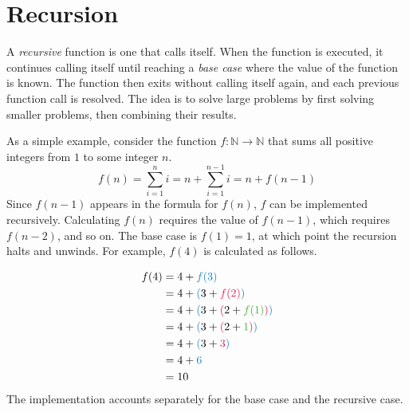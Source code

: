 \section*{Recursion} %

A \emph{recursive} function is one that calls itself. 
When the function is executed, it continues calling itself until reaching a \emph{base case} where the value of the function is known. 
The function then exits without calling itself again, and each previous function call is resolved. 
The idea is to solve large problems by first solving smaller problems, then combining their results.

As a simple example, consider the function $f:\mathbb{N}\rightarrow\mathbb{N}$ that sums all positive integers from $1$ to some integer $n$. 
\[
f(n) = \sum_{i=1}^ni = n + \sum_{i=1}^{n-1}i = n + f(n-1)
\]
Since $f(n-1)$ appears in the formula for $f(n)$, $f$ can be implemented recursively.
Calculating $f(n)$ requires the value of $f(n - 1)$, which requires $f(n - 2)$, and so on.
The base case is $f(1) = 1$, at which point the recursion halts and unwinds.
For example, $f(4)$ is calculated as follows.

\begin{align*}
f(4) &= 4 + \textcolor{blue}{f(3)}\\
     &= 4 + \textcolor{blue}{(}3 + \textcolor{red}{f(2)}\textcolor{blue}{)}\\
     &= 4 + \textcolor{blue}{(}3 + \textcolor{red}{(}2 + \textcolor{green}{f(1)}\textcolor{red}{)}\textcolor{blue}{)}\\
     &= 4 + \textcolor{blue}{(}3 + \textcolor{red}{(}2 + \textcolor{green}{1}\textcolor{red}{)}\textcolor{blue}{)} \\%
     &= 4 + \textcolor{blue}{(}3 + \textcolor{red}{3}\textcolor{blue}{)}\\
     &= 4 + \textcolor{blue}{6}\\
     &= 10
\end{align*}
The implementation accounts separately for the base case and the recursive case.

